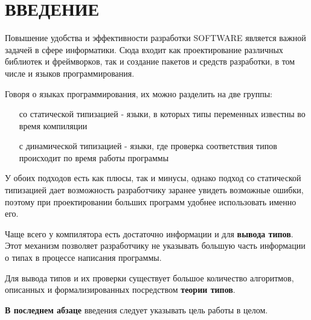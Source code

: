 \chapter*{ВВЕДЕНИЕ}\label{ch:introduction}

Повышение удобства и эффективности разработки \gls{SOFTWARE} является важной задачей в сфере информатики.
Сюда входит как проектирование различных библиотек и фреймворков, так и создание пакетов и средств разработки, в том числе и языков программирования.

Говоря о языках программирования, их можно разделить на две группы:
\begin{itemize}
    \item[со статической типизацией] - языки, в которых типы переменных известны во время компиляции
    \item[с динамической типизацией] - языки, где проверка соответствия типов происходит по время работы программы
\end{itemize}

У обоих подходов есть как плюсы, так и минусы, однако подход со статической типизацией дает возможность разработчику заранее увидеть возможные ошибки, поэтому при проектировании больших программ удобнее использовать именно его.

Чаще всего у компилятора есть достаточно информации и для \textbf{вывода типов}.
Этот механизм позволяет разработчику не указывать большую часть информации о типах в процессе написания программы.

Для вывода типов и их проверки существует большое количество алгоритмов, описанных и формализированных посредством \textbf{теории типов}.

\textbf{В последнем абзаце} введения следует указывать цель работы в целом.

